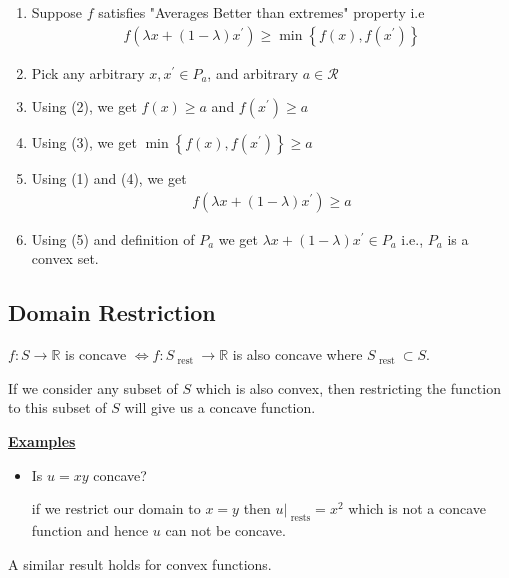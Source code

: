 \documentclass[12pt,a4paper]{article}
\begin{document}
\begin{enumerate}
    \item Suppose \(f\) satisfies "Averages Better than extremes" property i.e
    \begin{align*}
    f\left(\lambda x+(1-\lambda) x^{\prime}\right) \geq \min \left\{f(x), f\left(x^{\prime}\right)\right\}
    \end{align*}
    \item Pick any arbitrary \(x, x^{\prime} \in P_a\), and arbitrary \(a \in \mathcal{R}\)
    \item Using (2), we get \(f(x) \geq a\) and \(f\left(x^{\prime}\right) \geq a\)
    \item Using (3), we get \(\min \left\{f(x), f\left(x^{\prime}\right)\right\} \geq a\)
    \item Using (1) and (4), we get
    \begin{align*}
    f\left(\lambda x+(1-\lambda) x^{\prime}\right) \geq a 
    \end{align*}
    \item Using (5) and definition of \(P_a\) we get \(\lambda x+(1-\lambda) x^{\prime} \in P_a\) i.e., \(P_a\) is a convex set.
\end{enumerate}
\subsection{Domain Restriction}
\(f: S \to \mathbb{R}\) is concave \(\Leftrightarrow f: S_{\text{ rest }} \to \mathbb{R} \) is also concave where \(S_{ \text{ rest }} \subset S\).    

If we consider any subset of \(S\) which is also convex, then restricting the function to this subset of \(S\) will give us a concave function.

\textbf{\underline{Examples}}
\begin{itemize}
    \item  Is \(u=xy\) concave?
    
    if we restrict our domain to \(x=y\) then \(u|_{\text{ rests}} = x^2\) which is not a concave function and hence \(u\) can not be concave.    
\end{itemize}
A similar result holds for convex functions.
\end{document}
